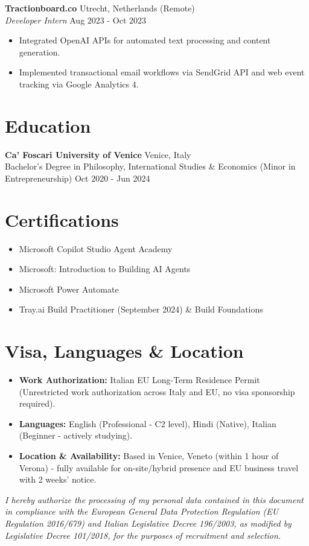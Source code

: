 \documentclass[10pt,a4paper]{article}
\begin{document}
\vspace{0.2em}
\textbf{Tractionboard.co} \hfill Utrecht, Netherlands (Remote)\\
\textit{Developer Intern} \hfill Aug 2023 - Oct 2023
\begin{itemize}
    \item Integrated OpenAI APIs for automated text processing and content generation.
    \item Implemented transactional email workflows via SendGrid API and web event tracking via Google Analytics 4.
\end{itemize}

\section*{Education}
\textbf{Ca' Foscari University of Venice} \hfill Venice, Italy\\
Bachelor's Degree in Philosophy, International Studies \& Economics (Minor in Entrepreneurship) \hfill Oct 2020 - Jun 2024

\section*{Certifications}
\begin{itemize}
    \item Microsoft Copilot Studio Agent Academy
    \item Microsoft: Introduction to Building AI Agents
    \item Microsoft Power Automate
    \item Tray.ai Build Practitioner (September 2024) \& Build Foundations
\end{itemize}

\section*{Visa, Languages \& Location}
\begin{itemize}
    \item \textbf{Work Authorization:} Italian EU Long-Term Residence Permit (Unrestricted work authorization across Italy and EU, no visa sponsorship required).
    \item \textbf{Languages:} English (Professional - C2 level), Hindi (Native), Italian (Beginner - actively studying).
    \item \textbf{Location \& Availability:} Based in Venice, Veneto (within 1 hour of Verona) - fully available for on-site/hybrid presence and EU business travel with 2 weeks' notice.
\end{itemize}

\vspace{0.8em}
\noindent\textit{\footnotesize I hereby authorize the processing of my personal data contained in this document in compliance with the European General Data Protection Regulation (EU Regulation 2016/679) and Italian Legislative Decree 196/2003, as modified by Legislative Decree 101/2018, for the purposes of recruitment and selection.}
\end{document}
